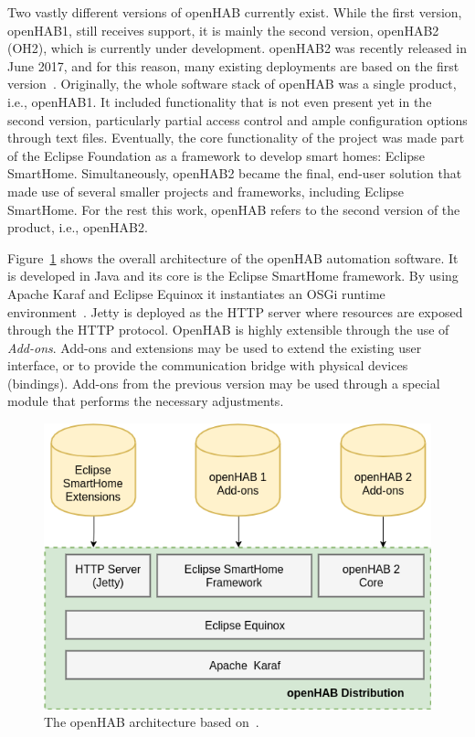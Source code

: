 \documentclass[12pt]{article}
\begin{document}
Two vastly different versions of openHAB currently exist. While the first version, openHAB1, still receives support, it is mainly the second version, openHAB2 (OH2), which is currently under development. openHAB2 was recently released in June 2017, and for this reason, many existing deployments are based on the first version~\cite{openhab_01}. Originally, the whole software stack of openHAB was a single product, i.e., openHAB1. It included functionality that is not even present yet in the second version, particularly partial access control and ample configuration options through text files. Eventually, the core functionality of the project was made part of the Eclipse Foundation as a framework to develop smart homes: Eclipse SmartHome. Simultaneously, openHAB2 became the final, end-user solution that made use of several smaller projects and frameworks, including Eclipse SmartHome. For the rest this work, openHAB refers to the second version of the product, i.e., openHAB2.

Figure~\ref{fig:oh_architecture} shows the overall architecture of the openHAB automation software. It is developed in Java and its core is the Eclipse SmartHome framework. By using Apache Karaf and Eclipse Equinox it instantiates an OSGi runtime environment~\cite{openhab_02}. Jetty is deployed as the HTTP server where resources are exposed through the HTTP protocol. OpenHAB is highly extensible through the use of \emph{Add-ons}. Add-ons and extensions may be used to extend the existing user interface, or to provide the communication bridge with physical devices (bindings). Add-ons from the previous version may be used through a special module that performs the necessary adjustments. 

\begin{figure} [ht] 
\begin{center}
\includegraphics[width=\textwidth]{oh_architecture}
\caption{The openHAB architecture based on~\cite{openhab_02}.}
\label{fig:oh_architecture}
\end{center}
\end{figure}
\end{document}
